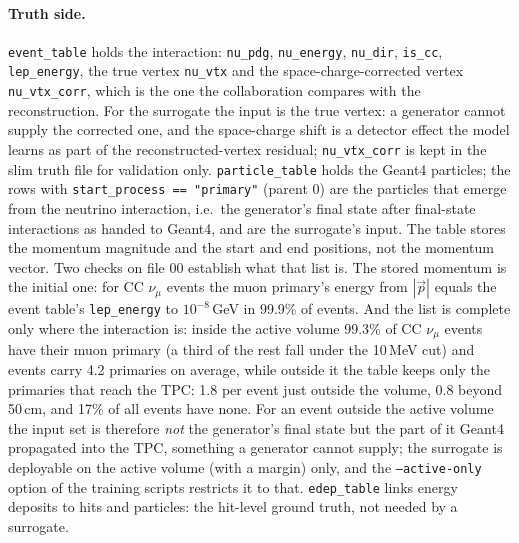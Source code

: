 \documentclass[10pt,letterpaper]{article}
\newcommand{\code}[1]{\texttt{#1}}
\newcommand{\pct}[1]{#1\%}
\begin{document}
\paragraph{Truth side.} \code{event\_table} holds the interaction: \code{nu\_pdg}, \code{nu\_energy}, \code{nu\_dir},
\code{is\_cc}, \code{lep\_energy}, the true vertex \code{nu\_vtx} and the space-charge-corrected vertex
\code{nu\_vtx\_corr}, which is the one the collaboration compares with the reconstruction. For the surrogate the
input is the true vertex: a generator cannot supply the corrected one, and the space-charge shift is a detector
effect the model learns as part of the reconstructed-vertex residual; \code{nu\_vtx\_corr} is kept in the slim
truth file for validation only. \code{particle\_table} holds the Geant4
particles; the rows with \code{start\_process == "primary"} (parent 0) are the particles that emerge from the
neutrino interaction, i.e.\ the generator's final state after final-state interactions as handed to Geant4, and are the
surrogate's input. The table stores the momentum magnitude and the start and end positions, not the momentum vector.
Two checks on file 00 establish what that list is. The stored momentum is the initial one: for CC $\nu_\mu$ events
the muon primary's energy from $|\vec p|$ equals the event table's \code{lep\_energy} to $10^{-8}$\,GeV in
\pct{99.9} of events. And the list is complete only where the interaction is: inside the active volume \pct{99.3} of
CC $\nu_\mu$ events have their muon primary (a third of the rest fall under the 10\,MeV cut) and events carry 4.2
primaries on average, while outside it the table keeps only the primaries that reach the TPC: 1.8 per event just
outside the volume, 0.8 beyond 50\,cm, and \pct{17} of all events have none. For an event outside the active volume
the input set is therefore \emph{not} the generator's final state but the part of it Geant4 propagated into the TPC,
something a generator cannot supply; the surrogate is deployable on the active volume (with a margin) only, and the
\code{--active-only} option of the training scripts restricts it to that.
\code{edep\_table} links energy deposits to hits and particles: the hit-level ground truth, not needed by a surrogate.
\end{document}
